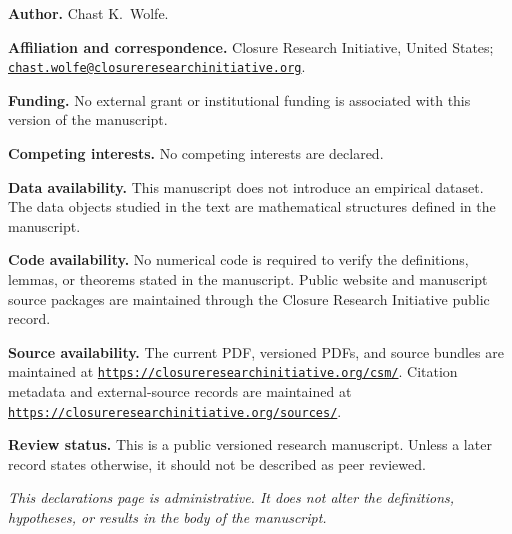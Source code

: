 \clearpage
\thispagestyle{empty}
\begingroup
\small
\raggedright
\vspace*{0.65in}


\vspace{0.22in}

\noindent
\textbf{Author.}
Chast K.~Wolfe.

\vspace{0.10in}

\noindent
\textbf{Affiliation and correspondence.}
Closure Research Initiative, United States;
\href{mailto:chast.wolfe@closureresearchinitiative.org}
{\texttt{chast.wolfe@closureresearchinitiative.org}}.

\vspace{0.10in}

\noindent
\textbf{Funding.}
No external grant or institutional funding is associated with this
version of the manuscript.

\vspace{0.10in}

\noindent
\textbf{Competing interests.}
No competing interests are declared.

\vspace{0.10in}

\noindent
\textbf{Data availability.}
This manuscript does not introduce an empirical dataset.  The data
objects studied in the text are mathematical structures defined in the
manuscript.

\vspace{0.10in}

\noindent
\textbf{Code availability.}
No numerical code is required to verify the definitions, lemmas, or
theorems stated in the manuscript.  Public website and manuscript source
packages are maintained through the Closure Research Initiative public
record.

\vspace{0.10in}

\noindent
\textbf{Source availability.}
The current PDF, versioned PDFs, and source bundles are maintained at
\href{https://closureresearchinitiative.org/csm/}
{\texttt{https://closureresearchinitiative.org/csm/}}.  Citation metadata
and external-source records are maintained at
\href{https://closureresearchinitiative.org/sources/}
{\texttt{https://closureresearchinitiative.org/sources/}}.

\vspace{0.10in}

\noindent
\textbf{Review status.}
This is a public versioned research manuscript.  Unless a later record
states otherwise, it should not be described as peer reviewed.

\vfill
\noindent
\textit{This declarations page is administrative.  It does not alter the
definitions, hypotheses, or results in the body of the manuscript.}

\endgroup
\clearpage
